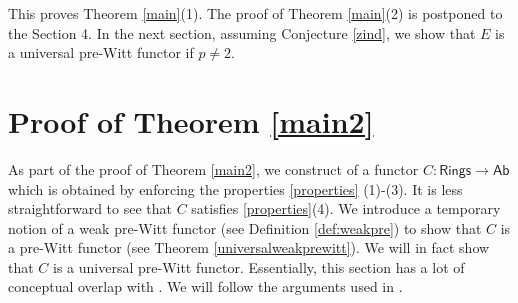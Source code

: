 \documentclass[11pt]{amsart}
\theoremstyle{plain}
\theoremstyle{definition}
\newcommand{\Rings}{{\mathsf{Rings}}}
\begin{document}
\noindent This proves Theorem \ref{main}(1). The proof of Theorem \ref{main}(2) is postponed to the Section 4. In the next section, assuming Conjecture \ref{zind}, we show that $E$ is a universal pre-Witt functor if $p\neq 2$. 
\section{Proof of Theorem \ref{main2}}
 \noindent As part of the proof of Theorem \ref{main2}, we construct of a functor $C: \Rings \to \mathsf{Ab}$ which is obtained by enforcing the properties \ref{properties} (1)-(3). It is less straightforward to see that $C$ satisfies \ref{properties}(4). We introduce a temporary notion of a weak pre-Witt functor (see Definition \ref{def:weakpre}) to show that $C$ is a pre-Witt functor (see Theorem \ref{universalweakprewitt}). We will in fact show that $C$ is a universal pre-Witt functor. Essentially, this section has a lot of conceptual overlap with \cite[Section 3]{ps}. We will follow the arguments used in \cite[Section 3]{ps}.
\end{document}
